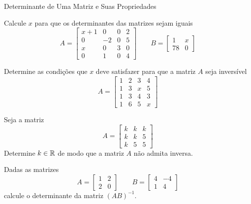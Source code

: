 \begin{exercicios}{Determinante de Uma Matriz e Suas Propriedades}
    \begin{exercicio}
        Calcule $x$ para que os determinantes das matrizes sejam iguais 
        \[A=\left[\begin{array}{crcc}
        	x + 1 &  0 & 0 & 2 \\
        	  0   & -2 & 0 & 5 \\
        	  x   &  0 & 3 & 0 \\
        	  0   &  1 & 0 & 4
        \end{array} \right] 
        \qquad
        B=
        \left[\begin{array}{cc}
        	1  & x \\
        	78 & 0
        \end{array} \right]\]
    \end{exercicio}
    
    \begin{exercicio}
        Determine as condições que $x$ deve satisfazer para que a matriz $A$ seja inversível
        \[A = \left[\begin{array}{cccc}
            1 & 2 & 3 & 4 \\ 
            1 & 3 & x & 5 \\ 
            1 & 3 & 4 & 3 \\ 
            1 & 6 & 5 & x
        \end{array} \right]\]
    \end{exercicio}
    
    \begin{exercicio}
        Seja a matriz 
        \[A = \left[\begin{array}{ccc}
            k & k & k \\ 
            k & k & 5 \\ 
            k & 5 & 5
        \end{array} \right]\]
        Determine $k \in \mathbb{R}$ de modo que a matriz $A$ não admita inversa.
    \end{exercicio}
    
    \begin{exercicio}
        Dadas as matrizes
        \[A = \left[\begin{array}{cc}
        	1 & 2 \\
        	2 & 0
        \end{array} \right]
        \qquad
        B = \left[\begin{array}{cr}
        	4 & -4 \\
        	1 &  4
        \end{array} \right]\]
        calcule o determinante da matriz $(AB)^{-1}$.
    \end{exercicio}
     
\end{exercicios} %

